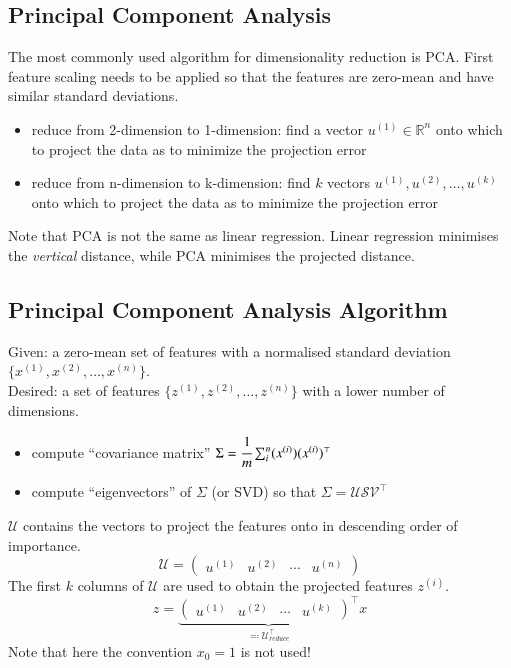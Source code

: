 \documentclass[a4paper,twoside,10pt]{article}
\begin{document}
\subsection{Principal Component Analysis}
The most commonly used algorithm for dimensionality reduction is \ac{PCA}.
First feature scaling needs to be applied so that the features are zero-mean and have similar standard deviations.
\begin{itemize}
  \item reduce from 2-dimension to 1-dimension: find a vector $u^{(1)}\in\mathbb{R}^n$ onto which to project the data as to minimize the projection error
  \item reduce from n-dimension to k-dimension: find $k$ vectors $u^{(1)},u^{(2)},\ldots,u^{(k)}$ onto which to project the data as to minimize the projection error
\end{itemize}
Note that \ac{PCA} is not the same as linear regression. Linear regression minimises the \emph{vertical} distance, while PCA minimises the projected distance.

\subsection{Principal Component Analysis Algorithm}\label{cha:pca}
Given: a zero-mean set of features with a normalised standard deviation $\{x^{(1)},x^{(2)},\ldots,x^{(n)}\}$.\\
Desired: a set of features $\{z^{(1)},z^{(2)},\ldots,z^{(n)}\}$ with a lower number of dimensions.\\
\begin{itemize}
  \item compute ``covariance matrix'' $\Sigma=\cfrac{1}{m}\sum_i^n(x^{(i)})(x^{(i)})^\top$
  \item compute ``eigenvectors'' of $\Sigma$ (or \ac{SVD}) so that $\Sigma=\mathcal{U}\mathcal{S}\mathcal{V}^\top$
\end{itemize}
$\mathcal{U}$ contains the vectors to project the features onto in descending order of importance.
\begin{equation*}
  \mathcal{U}=\begin{pmatrix}u^{(1)}&u^{(2)}&\cdots&u^{(n)}\end{pmatrix}
\end{equation*}
The first $k$ columns of $\mathcal{U}$ are used to obtain the projected features $z^{(i)}$.
\begin{equation*}
  z=\underbrace{\begin{pmatrix}u^{(1)}&u^{(2)}&\cdots&u^{(k)}\end{pmatrix}^\top}_{\eqqcolon\mathcal{U}_{reduce}^\top} x
\end{equation*}
Note that here the convention $x_0=1$ is not used!
\end{document}
